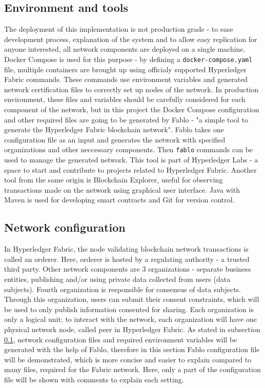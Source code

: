 \documentclass[12pt]{article}
\begin{document}
    \subsection{Environment and tools}
    \label{subsec:environment}
    The deployment of this implementation is not production grade - to ease development process, explanation of the system and to allow easy replication for anyone interested, all network components are deployed on a single machine. Docker Compose is used for this purpose - by defining a \lstinline{docker-compose.yaml} file, multiple containers are brought up using officialy supported Hyperledger Fabric commands. These commands use environment variables and generated network certification files to correctly set up nodes of the network. In production environment, these files and variables should be carefully considered for each component of the network, but in this project the Docker Compose configuration and other required files are going to be generated by Fablo - "a simple tool to generate the Hyperledger Fabric blockchain network"\cite{fablo}. Fablo takes one configuration file as an input and generates the network with specified organizations and other neccessary components. Then \lstinline{fablo} commands can be used to manage the generated network. This tool is part of Hyperledger Labs - a space to start and contribute to projects related to Hyperledger Fabric. Another tool from the same origin is Blockchain Explorer\cite{explorer}, useful for observing transactions made on the network using graphical user interface. Java with Maven is used for developing smart contracts and Git for version control.

    \subsection{Network configuration}
    In Hyperledger Fabric, the node validating blockchain network transactions is called an orderer. Here, orderer is hosted by a regulating authority - a trusted third party. Other network components are 3 organizations - separate business entities, publishing and/or using private data collected from users (data subjects). Fourth organization is responsible for consensus of data subjects. Through this organization, users can submit their consent constraints, which will be used to only publish information consented for sharing. Each organization is only a logical unit; to interact with the network, each organization will have one physical network node, called peer in Hyperledger Fabric. As stated in subsection \ref{subsec:environment}, network configuration files and required environment variables will be generated with the help of Fablo, therefore in this section Fablo configuration file will be demonstrated, which is more concise and easier to explain compared to many files, required for the Fabric network. Here, only a part of the configuration file will be shown with comments to explain each setting.
\end{document}
